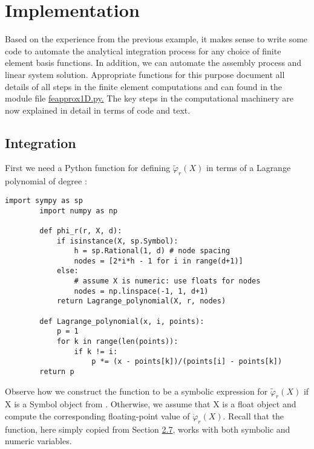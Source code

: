 \documentclass[../main.tex]{subfiles}
\begin{document}
	\chapter{Implementation}
	\label{chap:chap_4}
	\noindent Based on the experience from the previous example, it makes sense to write
	some code to automate the analytical integration process for any choice of finite
	element basis functions. In addition, we can automate the assembly process
	and linear system solution. Appropriate functions for this purpose document
	all details of all steps in the finite element computations and can found in the
	module file \href{https://github.com/hplgit/INF5620/blob/master/src/fem/fe_approx1D.py}{fe\textunderscore approx1D.py.} The key steps in the computational machinery are
	now explained in detail in terms of code and text.
	\section[Integration]{Integration}
	\label{sec:sec_4_1}
	First we need a Python function for defining $\tilde{\varphi}_{r}(X)$ in terms of a Lagrange polynomial of degree :
	\begin{lstlisting}[numbers=none]
		import sympy as sp
		import numpy as np
		
		def phi_r(r, X, d):
			if isinstance(X, sp.Symbol):
				h = sp.Rational(1, d) # node spacing
				nodes = [2*i*h - 1 for i in range(d+1)]
			else:
				# assume X is numeric: use floats for nodes
				nodes = np.linspace(-1, 1, d+1)
			return Lagrange_polynomial(X, r, nodes)
		
		def Lagrange_polynomial(x, i, points):
			p = 1
			for k in range(len(points)):
				if k != i:
					p *= (x - points[k])/(points[i] - points[k])
		return p	
	\end{lstlisting}
	Observe how we construct the  function to be a symbolic expression for $\tilde{\varphi}_{r}(X)$ if $\mathrm{X}$ is a Symbol object from . Otherwise, we assume that $\mathrm{X}$ is a float object and compute the corresponding floating-point value of $\ddot{\varphi}_{r}(X)$. Recall that the  function, here simply copied from Section \hyperref[sec:sec_2_7]{2.7}, works with both symbolic and numeric variables.
	
\end{document}
